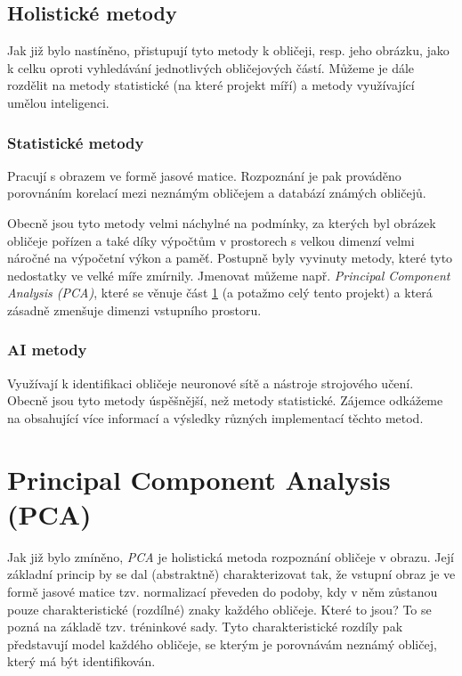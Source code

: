 \documentclass[10pt,a4paper]{article}
\begin{document}
\subsection{Holistické metody}

Jak již bylo nastíněno, přistupují tyto metody k obličeji, resp. jeho obrázku, jako k celku oproti vyhledávání
jednotlivých obličejových částí. Můžeme je dále rozdělit na metody statistické (na které projekt míří) a metody 
využívající umělou inteligenci.

\subsubsection{Statistické metody}

Pracují s obrazem ve formě jasové matice. Rozpoznání je pak prováděno porovnáním korelací mezi neznámým obličejem
a databází známých obličejů.

Obecně jsou tyto metody velmi náchylné na podmínky, za kterých byl obrázek obličeje pořízen a také díky výpočtům
v prostorech s velkou dimenzí velmi náročné na výpočetní výkon a paměť. Postupně byly vyvinuty metody, které
tyto nedostatky ve velké míře zmírnily. Jmenovat můžeme např. \textit{Principal Component Analysis (PCA)}, které se věnuje
část \ref{pca} (a potažmo celý tento projekt) a která zásadně zmenšuje dimenzi vstupního prostoru.

\subsubsection{AI metody}

Využívají k identifikaci obličeje neuronové sítě a nástroje strojového učení. Obecně jsou tyto metody úspěšnější, než
metody statistické. Zájemce odkážeme na \cite{jafri} obsahující více informací a výsledky různých implementací těchto metod.

\section{Principal Component Analysis (PCA)}
\label{pca}

Jak již bylo zmíněno, \textit{PCA} je holistická metoda rozpoznání obličeje v obrazu. Její základní princip by se dal
(abstraktně) charakterizovat tak, že vstupní obraz je ve formě jasové matice tzv. normalizací převeden do podoby, kdy v
něm zůstanou pouze charakteristické (rozdílné) znaky každého obličeje. Které to jsou? To se pozná na základě tzv. 
tréninkové sady. Tyto charakteristické rozdíly pak představují model každého obličeje, se kterým je porovnávám neznámý
obličej, který má být identifikován.
\end{document}
